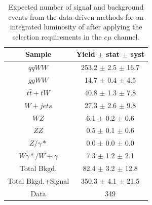 \begin{table}[ht!]
  \begin{center}
  \begin{tabular} {|c|c|}
\hline
Sample                & Yield $\pm$ stat $\pm$ syst \\ \hline \hline
$qqWW$                & 253.2 $\pm$  2.5 $\pm$ 16.7  \\ \hline
$ggWW$                & 14.7 $\pm$  0.4 $\pm$  4.5  \\ \hline
$t\bar{t} + tW$      & 40.8 $\pm$  1.3 $\pm$  7.8  \\ \hline
$W+jets$              & 27.3 $\pm$  2.6 $\pm$  9.8  \\ \hline
$WZ$             &  6.1 $\pm$  0.2 $\pm$  0.6  \\ \hline
$ZZ$             &  0.5 $\pm$  0.1 $\pm$  0.6  \\ \hline
$Z/\gamma*$          &  0.0 $\pm$  0.0 $\pm$  0.0  \\ \hline
$W\gamma*/W+\gamma$ &  7.3 $\pm$  1.2 $\pm$  2.1  \\ \hline \hline
Total Bkgd.           & 82.4 $\pm$  3.2 $\pm$ 12.8  \\ \hline \hline
Total Bkgd.+Signal    & 350.3 $\pm$  4.1 $\pm$ 21.5  \\ \hline \hline
Data                  & 349 \\ \hline
\end{tabular}
  \caption{Expected number of signal and background events from the data-driven methods for
  an integrated luminosity of \intlumi after applying the selection requirements in the $e \mu$ channel.}
   \label{tab:data_yields_em}
  \end{center}
\end{table}

